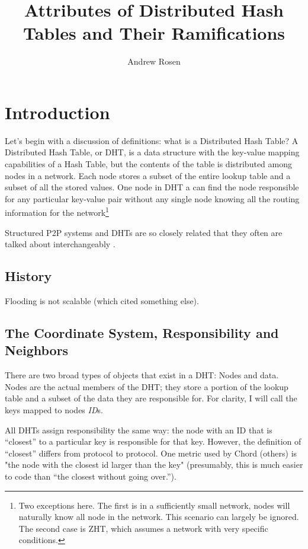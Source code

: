 \documentclass[10pt,letterpaper]{report}
\author{Andrew Rosen}
\title{Attributes of Distributed Hash Tables and Their Ramifications}
\begin{document}
\maketitle
\setcounter{tocdepth}{4}



\tableofcontents

\chapter{Introduction}
Let's begin with a discussion of definitions:  what is a Distributed Hash Table?
A Distributed Hash Table, or DHT, is a data structure with the key-value mapping capabilities of a Hash Table, but the contents of the table is distributed among nodes in a network.
Each node stores a subset of the entire lookup table and a subset of all the stored values.
One node in DHT a can find the node responsible for any particular key-value pair without any single node knowing all the routing information for the network\footnote{Two exceptions here.  
The first is in a sufficiently small network, nodes will naturally know  all node in the network. This scenario can largely be ignored.  The second case is ZHT, which assumes a network with very specific conditions.}




Structured P2P systems and DHTs are so closely related that they often are talked about interchangeably  \cite{wu2004handbook} \cite{lua2005survey}. 



\section{History}

Flooding is not scalable \cite{can} (which cited something else).
\section{The Coordinate System, Responsibility and Neighbors}


There are two  broad types of objects that exist in a DHT: Nodes and data.  
Nodes are the actual members of the DHT; they store a portion of the lookup table and a subset of the data they are responsible for. 
For clarity, I will call the keys mapped to nodes \textit{ID}s. 

All DHTs assign responsibility the same way:  the node with an ID that is ``closest'' to a particular key is responsible for that key.  
However, the definition of ``closest'' differs from protocol to protocol.
One metric used by Chord (others) is "the node with the closest id larger than the key" (presumably, this is much easier to code than ``the closest without going over.'').
\end{document}
